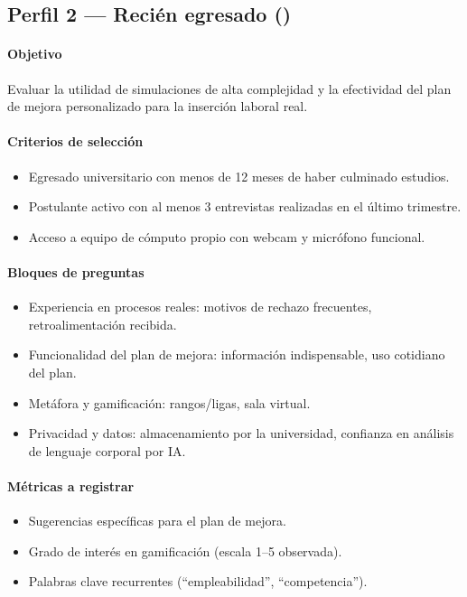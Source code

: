 \subsection{Perfil 2 --- Recién egresado ()}

\paragraph{Objetivo} Evaluar la utilidad de simulaciones de alta
complejidad y la efectividad del plan de mejora personalizado para la
inserción laboral real.

\paragraph{Criterios de selección}
\begin{itemize}
  \item Egresado universitario con menos de 12 meses de haber culminado
        estudios.
  \item Postulante activo con al menos 3 entrevistas realizadas en el
        último trimestre.
  \item Acceso a equipo de cómputo propio con webcam y micrófono
        funcional.
\end{itemize}

\paragraph{Bloques de preguntas}
\begin{itemize}
  \item Experiencia en procesos reales: motivos de rechazo frecuentes,
        retroalimentación recibida.
  \item Funcionalidad del plan de mejora: información indispensable,
        uso cotidiano del plan.
  \item Metáfora y gamificación: rangos/ligas, sala virtual.
  \item Privacidad y datos: almacenamiento por la universidad,
        confianza en análisis de lenguaje corporal por IA.
\end{itemize}

\paragraph{Métricas a registrar}
\begin{itemize}
  \item Sugerencias específicas para el plan de mejora.
  \item Grado de interés en gamificación (escala 1--5 observada).
  \item Palabras clave recurrentes (``empleabilidad'', ``competencia'').
\end{itemize}

